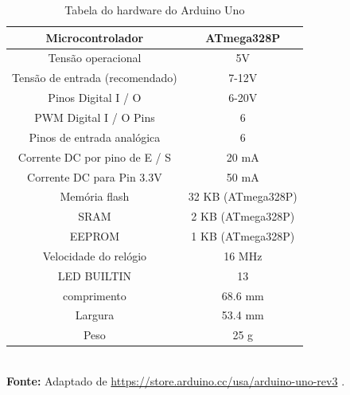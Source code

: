 \FloatBarrier
\begin{table}[!htbp]
	\centering
	\caption{Tabela do hardware do Arduino Uno}
	\begin{tabular}{ c | c }
		\hline
		Microcontrolador                & ATmega328P                                            \\ \hline
		Tensão operacional              & 5V                                                    \\ \hline
		Tensão de entrada (recomendado) & 7-12V                                                 \\ \hline
		Pinos Digital I / O             & 6-20V                                                 \\ \hline
		PWM Digital I / O Pins          & 6                                                     \\ \hline
		Pinos de entrada analógica      & 6                                                     \\ \hline
		Corrente DC por pino de E / S   & 20 mA                                                 \\ \hline
		Corrente DC para Pin 3.3V       & 50 mA                                                 \\ \hline
		Memória flash                   & 32 KB (ATmega328P) \\ \hline
		SRAM                            & 2 KB (ATmega328P)                                     \\ \hline
		EEPROM                          & 1 KB (ATmega328P)                                     \\ \hline
		Velocidade do relógio           & 16 MHz                                                \\ \hline
		LED BUILTIN                     & 13                                                    \\ \hline
		comprimento                     & 68.6 mm                                               \\ \hline
		Largura                         & 53.4 mm                                               \\ \hline
		Peso                            & 25 g                                                  \\ \hline
	\end{tabular}
	\\ \vspace{0.2cm}
	\textbf{Fonte:} Adaptado de \url{https://store.arduino.cc/usa/arduino-uno-rev3} .
	\label{tab:ArduinoUno}
\end{table}
\FloatBarrier


